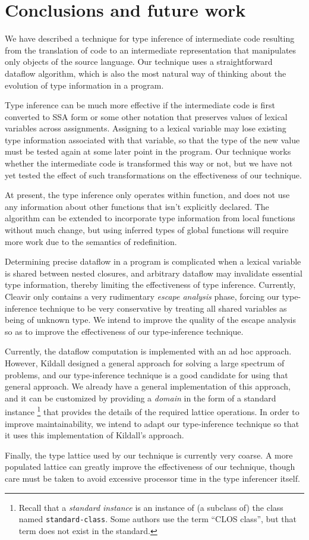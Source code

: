 \section{Conclusions and future work}

We have described a technique for type inference of intermediate code
resulting from the translation of \commonlisp{} code to an
intermediate representation that manipulates only objects of the
source language.  Our technique uses a straightforward dataflow
algorithm, which is also the most natural way of thinking about the
evolution of type information in a \commonlisp{} program.

Type inference can be much more effective if the intermediate code is
first converted to SSA form \cite{Cytron:1989:EMC:75277.75280,
  Cytron:1991:ECS:115372.115320} or some other notation that preserves
values of lexical variables across assignments.  Assigning to a
lexical variable may lose existing type information associated with
that variable, so that the type of the new value must be tested again
at some later point in the program.  Our technique works whether the
intermediate code is transformed this way or not, but we have not yet
tested the effect of such transformations on the effectiveness of our
technique.

At present, the type inference only operates within function, and does
not use any information about other functions that isn't explicitly
declared. The algorithm can be extended to incorporate type information
from local functions without much change, but using inferred types of
global functions will require more work due to the semantics of
redefinition.

Determining precise dataflow in a \commonlisp{} program is complicated
when a lexical variable is shared between nested closures, and
arbitrary dataflow may invalidate essential type information, thereby
limiting the effectiveness of type inference.  Currently, Cleavir only
contains a very rudimentary \emph{escape analysis} phase, forcing our
type-inference technique to be very conservative by treating all shared
variables as being of unknown type.  We intend to improve the quality
of the escape analysis so as to improve the effectiveness of our
type-inference technique.

Currently, the dataflow computation is implemented with an ad hoc
approach.  However, Kildall \cite{Kildall:1973:UAG:512927.512945}
designed a general approach for solving a large spectrum of problems,
and our type-inference technique is a good candidate for using that
general approach.  We already have a general implementation of this
approach, and it can be customized by providing a \emph{domain} in the
form of a standard instance%
\footnote{Recall that a \emph{standard instance} is an instance of
  (a subclass of) the class named \texttt{standard-class}.  Some
  authors use the term ``CLOS class'', but that term does not exist in
  the \commonlisp{} standard.}
that provides the details of the required lattice operations.  In
order to improve maintainability, we intend to adapt our
type-inference technique so that it uses this implementation of
Kildall's approach.

Finally, the type lattice used by our technique is currently very
coarse.  A more populated lattice can greatly improve the
effectiveness of our technique, though care must be taken to avoid
excessive processor time in the type inferencer itself.
